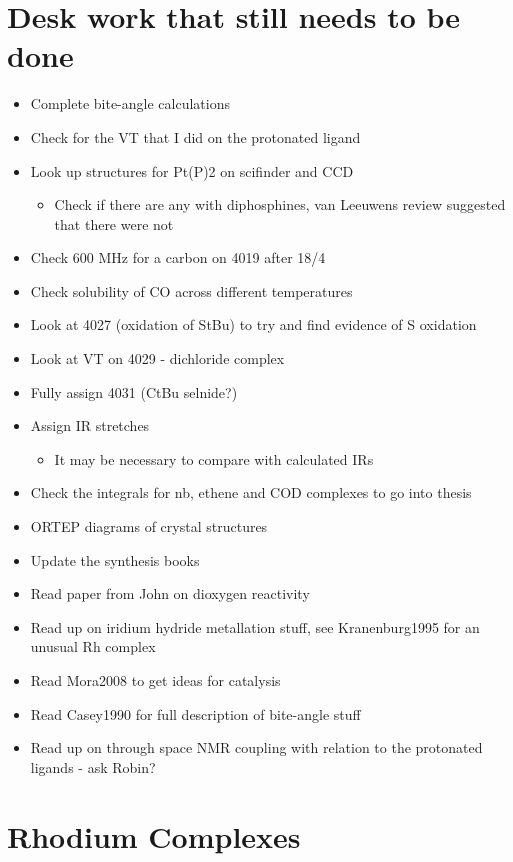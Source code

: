 \section{Desk work that still needs to be done}
\begin{itemize}
\item{Complete bite-angle calculations}
\item{Check for the VT that I did on the protonated ligand}
\item{Look up structures for Pt(P)2 on scifinder and CCD}
	\begin{itemize}
	\item{Check if there are any with diphosphines, van Leeuwens review suggested that there were not}
	\end{itemize}
\item{Check 600 MHz for a carbon on 4019 after 18/4}
\item{Check solubility of CO across different temperatures}
\item{Look at 4027 (oxidation of StBu) to try and find evidence of S oxidation}
\item{Look at VT on 4029 - dichloride complex}
\item{Fully assign 4031 (CtBu selnide?)}
\item{Assign IR stretches}
	\begin{itemize}
	\item{It may be necessary to compare with calculated IRs}
	\end{itemize}
\item{Check the integrals for nb, ethene and COD complexes to go into thesis}
\item{ORTEP diagrams of crystal structures}
\item{Update the synthesis books}
\item{Read paper from John on dioxygen reactivity}
\item{Read up on iridium hydride metallation stuff, see Kranenburg1995 for an unusual Rh complex}
\item{Read Mora2008 to get ideas for catalysis}
\item{Read Casey1990 for full description of bite-angle stuff}
\item{Read up on through space NMR coupling with relation to the protonated ligands - ask Robin?}
\end{itemize}

\section{Rhodium Complexes}
\label{section:experimental:rhodium}

